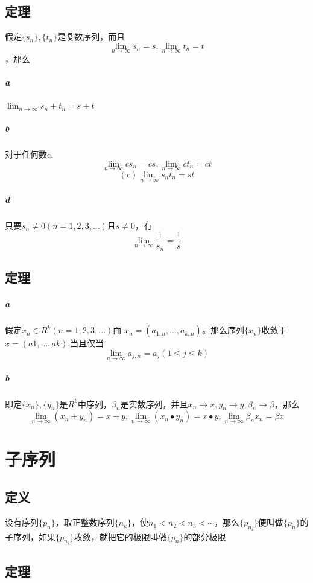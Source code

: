 \section{定理} 假定$\{s_n\},\{t_n\}$是复数序列，而且$$\lim_{n \to \infty}{s_n} = s, \lim_{n \to \infty}{t_n} = t$$，那么
\paragraph{a} $\lim_{n \to \infty}{s_n + t_n} = s + t$
\paragraph{b} 对于任何数c, $$ \lim_{n \to \infty}{cs_n} = cs, \lim_{n \to \infty}{ct_n} = ct$$
$$(c) \lim_{n \to \infty}{s_nt_n} = st$$
\paragraph{d} 只要$s_n \ne 0 (n = 1, 2, 3, ...)$且$s \ne 0$，有$$\lim_{n \to \infty}{\frac{1}{s_n}} = \frac{1}{s}$$
\section{定理}
\paragraph{a} 假定$x_n \in R^k (n = 1, 2, 3, ...)$而 $x_n = (a_{1,n}, ..., a_{k,n})$。那么序列$\{x_n\}$收敛于$x = (a1, ..., ak) $,当且仅当$$ \lim_{n \to \infty}{a_{j,n}} = a_j (1 \le j \le k) $$
\paragraph{b} 即定$\{x_n\}, \{y_n\}$是$R^k$中序列，${\beta}_n$是实数序列，并且$x_n \to x, y_n \to y, {\beta}_n \to \beta$，那么$$\lim_{n\to \infty}{(x_n + y_n)} = x + y, \lim_{n\to \infty}{(x_n \bullet y_n)} = x \bullet y, \lim_{n \to \infty}{{\beta}_nx_n} = {\beta}x$$
\subparagraph*{}
\chapter*{子序列}
\section{定义} 设有序列$\{p_n\}$，取正整数序列$\{n_k\}$，使$n_1 < n_2 < n_3 < \cdots$，那么$\{p_{n_i}\}$便叫做$\{p_n\}$的子序列，如果$\{p_{n_i}\}$收敛，就把它的极限叫做$\{p_n\}$的部分极限
\section{定理}
